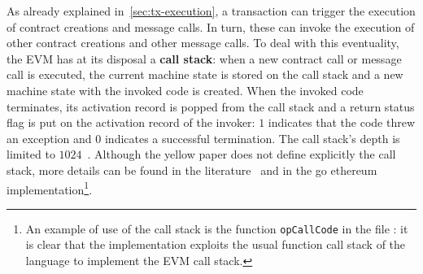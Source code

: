 As already explained in~\autoref{sec:tx-execution}, a transaction can trigger
the execution of contract creations and message calls. In turn, these can invoke
the execution of other contract creations and other message calls. To deal with
this eventuality, the EVM has at its disposal a \textbf{call stack}: when a new
contract call or message call is executed, the current machine state is stored
on the call stack and a new machine state with the invoked code is created. When
the invoked code terminates, its activation record is popped from the call stack
and a return status flag is put on the activation record of the invoker: $1$
indicates that the code threw an exception and $0$ indicates a successful
termination. The call stack's depth is limited to
$1024$~\cite{wood2018ethereum}. Although the yellow paper does not define
explicitly the call stack, more details can be found in the
literature~\cite{grishchenko2018semantic} and in the go ethereum
implementation\footnote{An example of use of the call stack is the function
\texttt{opCallCode} in the file : it is clear that
the implementation exploits the usual function call stack of the language to
implement the EVM call stack.}.
